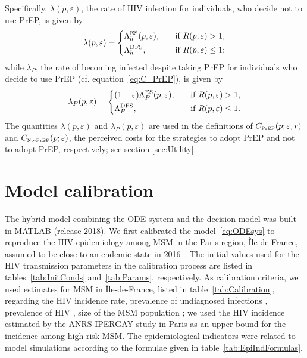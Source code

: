 \documentclass[12pt]{article}
\begin{document}
Specifically, $\lambda(p,\varepsilon)$, the rate of HIV infection for individuals, who decide not to use PrEP, is given by
\begin{equation}
	\lambda (p,\varepsilon) = \left\{
	\begin{aligned}
		&\Lambda_h^{\rm ES}(p,\varepsilon),& \quad \text{if } R(p,\varepsilon)>1,\\
		&\Lambda_h^{\rm DFS}, & \quad \text{if } R(p,\varepsilon)\leq 1;
	\end{aligned}
	\right.
\end{equation}
while $\lambda_P$, the rate of becoming infected despite taking PrEP for individuals who decide to use PrEP (cf. equation~\eqref{eq:C_PrEP}), is given by
\begin{equation} \label{eq:lambda_P}
	\lambda_P (p,\varepsilon) = \left\{
	\begin{aligned}
		&(1-\varepsilon)\Lambda_P^{\rm ES}(p,\varepsilon),& \quad \text{if } R(p,\varepsilon)>1,\\
		&\Lambda_P^{\rm DFS}, & \quad \text{if } R(p,\varepsilon)\leq 1.
	\end{aligned}
	\right.
\end{equation}
The quantities $\lambda(p,\varepsilon)$ and $\lambda_P(p,\varepsilon)$ are used in the definitions of $C_{\text{\tiny PrEP}}(p;\varepsilon, r)$ and $C_{\text{\tiny No-PrEP}}(p;\varepsilon)$, the perceived costs for the strategies to adopt PrEP and not to adopt PrEP, respectively; see section \ref{sec:Utility}.


\newpage
\section{Model calibration} \label{sec:Calibration}

The hybrid model combining the ODE system and the decision model was built in MATLAB (release 2018). We first calibrated the model~\eqref{eq:ODEsys} to reproduce the HIV epidemiology among MSM in the Paris region, \^Ile-de-France, assumed to be close to an endemic state in 2016~\cite{RapportSPF2019}. The initial values used for the HIV transmission parameters in the calibration process are listed in tables~\ref{tab:InitConds} and~\ref{tab:Params}, respectively. As calibration criteria, we used estimates for MSM in \^Ile-de-France, listed in table~\ref{tab:Calibration}, regarding the HIV incidence rate, prevalence of undiagnosed infections \cite{Marty2019}, prevalence of HIV \cite{Prevagay2017}, size of the MSM population \cite{Bajos2018,Insee2015}; we used the HIV incidence estimated by the ANRS IPERGAY study in Paris \cite{Molina2018} as an upper bound for the incidence among high-risk MSM. The epidemiological indicators were related to model simulations according to the formulae given in table~\ref{tab:EpiIndFormulas}. 
\end{document}
